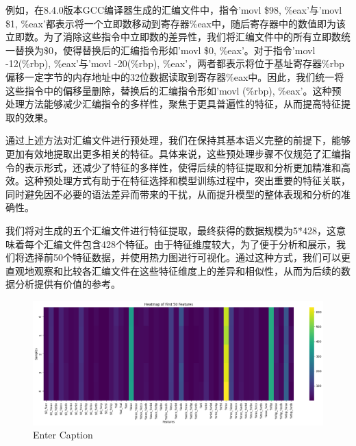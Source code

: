   例如，在8.4.0版本GCC编译器生成的汇编文件中，指令'movl \$98, \%eax'与'movl \$1, \%eax'都表示将一个立即数移动到寄存器\%eax中，随后寄存器中的数值即为该立即数。为了消除这些指令中立即数的差异性，我们将汇编文件中的所有立即数统一替换为\$0，使得替换后的汇编指令形如'movl \$0, \%eax'。对于指令'movl -12(\%rbp), \%eax'与'movl -20(\%rbp), \%eax'，两者都表示将位于基址寄存器\%rbp偏移一定字节的内存地址中的32位数据读取到寄存器\%eax中。因此，我们统一将这些指令中的偏移量删除，替换后的汇编指令形如'movl (\%rbp), \%eax'。这种预处理方法能够减少汇编指令的多样性，聚焦于更具普遍性的特征，从而提高特征提取的效果。

  通过上述方法对汇编文件进行预处理，我们在保持其基本语义完整的前提下，能够更加有效地提取出更多相关的特征。具体来说，这些预处理步骤不仅规范了汇编指令的表示形式，还减少了特征的多样性，使得后续的特征提取和分析更加精准和高效。这种预处理方式有助于在特征选择和模型训练过程中，突出重要的特征关联，同时避免因不必要的语法差异而带来的干扰，从而提升模型的整体表现和分析的准确性。

  我们将对生成的五个汇编文件进行特征提取，最终获得的数据规模为5*428，这意味着每个汇编文件包含428个特征。由于特征维度较大，为了便于分析和展示，我们将选择前50个特征数据，并使用热力图进行可视化。通过这种方式，我们可以更直观地观察和比较各汇编文件在这些特征维度上的差异和相似性，从而为后续的数据分析提供有价值的参考。
  \begin{figure}
      \centering
      \includegraphics[width=1\linewidth]{figures/same.png}
      \caption{Enter Caption}
      \label{fig:same}
  \end{figure}


